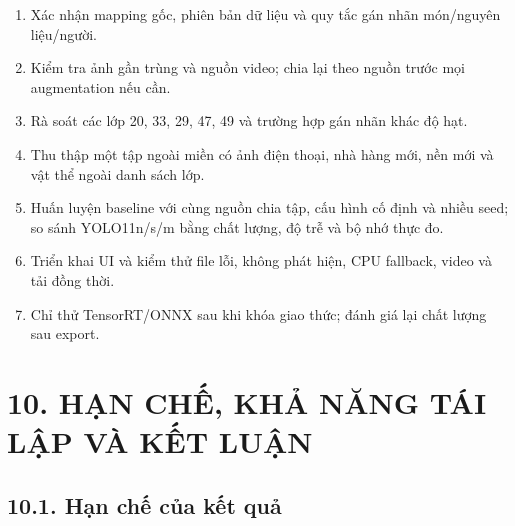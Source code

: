 \documentclass[
  vietnamese,
  12pt,
  a4paper,
]{article}
\providecommand{\tightlist}{%
  \setlength{\itemsep}{0pt}\setlength{\parskip}{0pt}}
\begin{document}
\begin{enumerate}
\def\labelenumi{\arabic{enumi}.}
\tightlist
\item
  Xác nhận mapping gốc, phiên bản dữ liệu và quy tắc gán nhãn món/nguyên
  liệu/người.
\item
  Kiểm tra ảnh gần trùng và nguồn video; chia lại theo nguồn trước mọi
  augmentation nếu cần.
\item
  Rà soát các lớp 20, 33, 29, 47, 49 và trường hợp gán nhãn khác độ hạt.
\item
  Thu thập một tập ngoài miền có ảnh điện thoại, nhà hàng mới, nền mới
  và vật thể ngoài danh sách lớp.
\item
  Huấn luyện baseline với cùng nguồn chia tập, cấu hình cố định và nhiều
  seed; so sánh YOLO11n/s/m bằng chất lượng, độ trễ và bộ nhớ thực đo.
\item
  Triển khai UI và kiểm thử file lỗi, không phát hiện, CPU fallback,
  video và tải đồng thời.
\item
  Chỉ thử TensorRT/ONNX sau khi khóa giao thức; đánh giá lại chất lượng
  sau export.
\end{enumerate}

\section{10. HẠN CHẾ, KHẢ NĂNG TÁI LẬP VÀ KẾT
LUẬN}\label{hux1ea1n-chux1ebf-khux1ea3-nux103ng-tuxe1i-lux1eadp-vuxe0-kux1ebft-luux1eadn}

\subsection{10.1. Hạn chế của kết
quả}\label{hux1ea1n-chux1ebf-cux1ee7a-kux1ebft-quux1ea3}

\begingroup\small\setlength{\tabcolsep}{4pt}\renewcommand{\arraystretch}{1.12}
\end{document}
